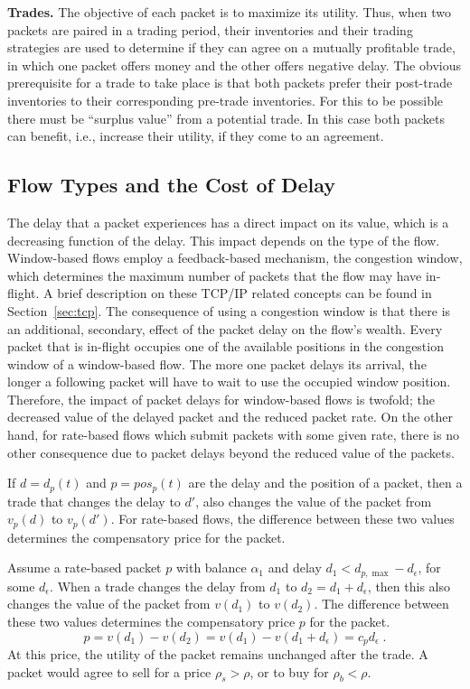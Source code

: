 \documentclass[letterpaper,10pt]{llncs}
\begin{document}
\textbf{Trades.}
The objective of each packet is to maximize its utility.
Thus, when two packets are paired in a trading period, their inventories and their
trading strategies are used to determine if they can agree on a mutually profitable trade,
in which one packet offers money and the other offers negative delay.
The obvious prerequisite for a trade to take place is that both packets prefer their
post-trade inventories to their corresponding pre-trade inventories.
For this to be possible there must be ``surplus value'' from a potential trade.
In this case both packets can benefit, i.e., increase their utility, if they come to
an agreement.

\subsection{Flow Types and the Cost of Delay}
The delay that a packet experiences has a direct impact on its value, which is a decreasing function of the delay. 
This impact depends on the type of the flow. 
Window-based flows employ a feedback-based mechanism, the congestion window, which determines the maximum number 
of packets that the flow may have in-flight. A brief description on these TCP/IP related concepts can be found in Section~\ref{sec:tcp}.
The consequence of using a congestion window is that there is an additional, secondary, effect of the packet delay on the flow's wealth. Every packet that is in-flight
occupies one of the available positions in the congestion window of a window-based flow. The more one
packet delays its arrival, the longer a following packet will have to wait to use the occupied window position. Therefore, the impact of packet delays for window-based flows is twofold; the decreased value of the delayed packet
and the reduced packet rate. 
On the other hand, for rate-based flows which submit packets with some given rate, there is no other consequence due to packet delays beyond the reduced value of 
the packets.

If $d = d_p(t)$ and $p = pos_p(t)$ are the delay and the position of a packet, 
then a trade that changes the delay to $d'$, also changes the 
value of the packet from $v_p(d)$ to $v_p(d')$. For rate-based flows, the difference
between these two values determines the compensatory price for the packet.

Assume a rate-based packet $p$ with balance $\alpha_1$ and 
delay $d_1 < d_{p,\max} - d_\epsilon$, for some $d_\epsilon$.
When a trade changes the delay from $d_1$ to $d_2=d_1+d_\epsilon$, then this 
also changes the value of the packet from $v(d_1)$ to $v(d_2)$. 
The difference between these two values determines the compensatory price 
$p$ for the packet.
\begin{equation}
\label{equ:priceRateBased}
p = v(d_1) - v(d_2) = v(d_1) - v(d_1 + d_\epsilon) = c_p d_\epsilon \; . 
\end{equation}
At this price, the utility of the packet remains unchanged after the trade.
A packet would agree to sell for a price $\rho_s > \rho$, or to buy for $\rho_b < \rho$.
\end{document}
